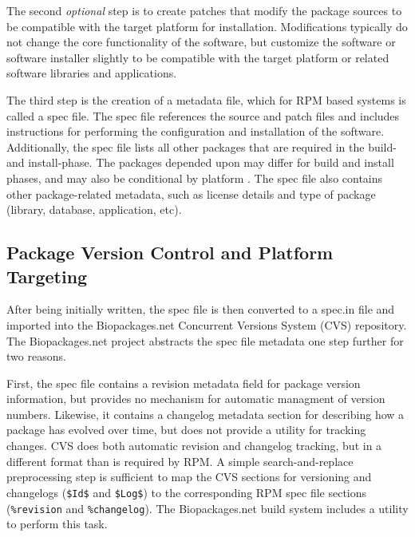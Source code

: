 The second \textit{optional} step is to create patches that modify the package
sources to be compatible with the target platform for installation.
Modifications typically do not change the core functionality of the software,
but customize the software or software installer slightly to be compatible with
the target platform or related software libraries and applications.

The third step is the creation of a metadata file, which for RPM based systems
is called a spec file.  The spec file references the source and patch
files and includes instructions for performing the configuration and
installation of the software.  Additionally, the spec file lists all other
packages that are required in the build- and
install-phase.  The packages depended upon may differ for build and install phases, and may also be conditional by platform .  The spec file also contains other package-related metadata, such as license details and
type of package (library, database, application, etc).

\subsection{Package Version Control and Platform Targeting}

After being initially written, the spec file is then converted to a spec.in
file and imported into the Biopackages.net Concurrent Versions System (CVS)
repository.  The Biopackages.net project abstracts the spec file metadata one
step further for two reasons.

First, the spec file contains a revision metadata field for package version
information, but provides no mechanism for automatic managment of version
numbers.  Likewise, it contains a changelog metadata section for describing
how a package has evolved over time, but does not provide a utility for
tracking changes.  CVS does both automatic revision and changelog tracking, but
in a different format than is required by RPM.  A simple search-and-replace
preprocessing step is sufficient to map the CVS sections for versioning and
changelogs (\texttt{\$Id\$} and \texttt{\$Log\$}) to the corresponding RPM spec
file sections (\texttt{\%revision} and \texttt{\%changelog}).  The
Biopackages.net build system includes a utility to perform this task.

